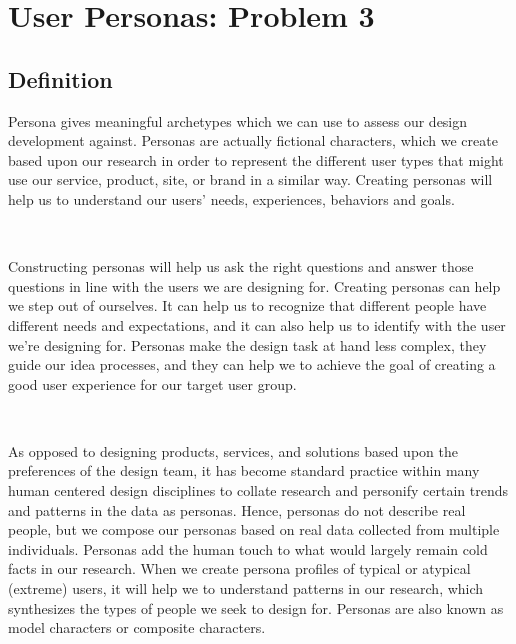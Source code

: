 \chapter{User Personas: Problem 3}
\vspace{6pt}

\section{Definition}
\vspace{4pt}
\noindent
Persona gives meaningful archetypes which we can use to assess our design development against. 
Personas are actually fictional characters, which we create based upon our research in order to represent the different user types that might use our service, product, site, or brand in a similar way. Creating personas will help us to understand our users’ needs, experiences, behaviors and goals.

\\
\vspace{4pt}
\noindent
\begin{flushleft} 

Constructing personas will help us ask the right questions and answer those questions in line with the users we are designing for. Creating personas can help we step out of ourselves. It can help us to recognize that different people have different needs and expectations, and it can also help us to identify with the user we’re designing for. Personas make the design task at hand less complex, they guide our idea processes, and they can help we to achieve the goal of creating a good user experience for our target user group.
\end{flushleft} 
\\
\vspace{4pt}
\noindent
\begin{flushleft} 
As opposed to designing products, services, and solutions based upon the preferences of the design team, it has become standard practice within many human centered design disciplines to collate research and personify certain trends and patterns in the data as personas. Hence, personas do not describe real people, but we compose our personas based on real data collected from multiple individuals. Personas add the human touch to what would largely remain cold facts in our research. When we create persona profiles of typical or atypical (extreme) users, it will help we to understand patterns in our research, which synthesizes the types of people we seek to design for. Personas are also known as model characters or composite characters.
\end{flushleft} 
